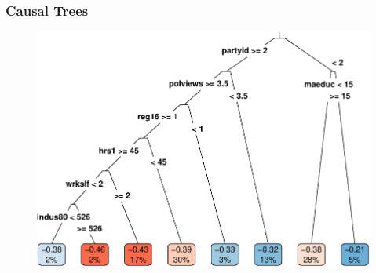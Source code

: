 \documentclass[
  shownotes,
  xcolor={svgnames},
  hyperref={colorlinks,citecolor=DarkBlue,linkcolor=DarkRed,urlcolor=DarkBlue}
  , aspectratio=169]{beamer}
\begin{document}
\begin{frame}[fragile]
\frametitle{Causal Trees}

\begin{figure}[H] \centering
            \captionsetup{justification=centering}
            \includegraphics[scale=0.6]{figures/unnamed-chunk-14-1.pdf}
              
 \end{figure}



\end{frame}
\end{document}
